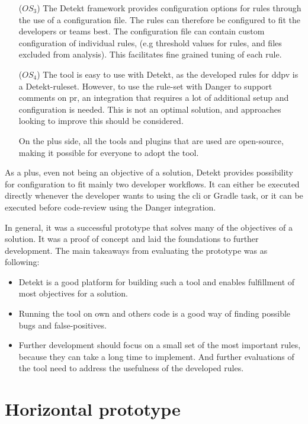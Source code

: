 \documentclass{report}
\begin{document}
\begin{itemize}
    \item [(\(OS_{3}\))] The Detekt framework provides configuration options for rules through the use of a configuration file. The rules can therefore be configured to fit the developers or teams best. The configuration file can contain custom configuration of individual rules, (e.g threshold values for rules, and files excluded from analysis). This facilitates fine grained tuning of each rule.  \label{vertical-os3}
    
    \item [(\(OS_{4}\))] The tool is easy to use with Detekt, as the developed rules for \gls{ddpv} is a Detekt-ruleset. However, to use the rule-set with Danger to support comments on \gls{pr}, an integration that requires a lot of additional setup and configuration is needed. This is not an optimal solution, and approaches looking to improve this should be considered. 
    
    On the plus side, all the tools and plugins that are used are open-source, making it possible for everyone to adopt the tool. \label{vertical-os4}

\end{itemize}

As a plus, even not being an objective of a solution, Detekt provides possibility for configuration to fit mainly two developer workflows. It can either be executed directly whenever the developer wants to using the \gls{cli} or Gradle task, or it can be executed before code-review using the Danger integration.

In general, it was a successful prototype that solves many of the objectives of a solution. It was a proof of concept and laid the foundations to further development. The main takeaways from evaluating the prototype was as following:
\begin{itemize}
    \item Detekt is a good platform for building such a tool and enables fulfillment of most objectives for a solution.
    \item Running the tool on own and others code is a good way of finding possible bugs and false-positives.
    \item Further development should focus on a small set of the most important rules, because they can take a long time to implement. And further evaluations of the tool need to address the usefulness of the developed rules.
\end{itemize}

\section{Horizontal prototype}
\label{horizontal-prototype}
\end{document}
